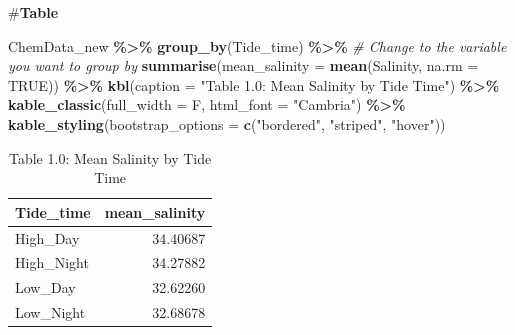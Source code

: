 \documentclass[
]{article}
\newenvironment{Shaded}{\begin{snugshade}}{\end{snugshade}}
\newcommand{\AttributeTok}[1]{\textcolor[rgb]{0.13,0.29,0.53}{#1}}
\newcommand{\CommentTok}[1]{\textcolor[rgb]{0.56,0.35,0.01}{\textit{#1}}}
\newcommand{\ConstantTok}[1]{\textcolor[rgb]{0.56,0.35,0.01}{#1}}
\newcommand{\FunctionTok}[1]{\textcolor[rgb]{0.13,0.29,0.53}{\textbf{#1}}}
\newcommand{\NormalTok}[1]{#1}
\newcommand{\SpecialCharTok}[1]{\textcolor[rgb]{0.81,0.36,0.00}{\textbf{#1}}}
\newcommand{\StringTok}[1]{\textcolor[rgb]{0.31,0.60,0.02}{#1}}
\begin{document}
\#\textbf{Table}

\begin{Shaded}
\begin{Highlighting}[]
\NormalTok{ChemData\_new }\SpecialCharTok{\%\textgreater{}\%}
  \FunctionTok{group\_by}\NormalTok{(Tide\_time) }\SpecialCharTok{\%\textgreater{}\%}  \CommentTok{\# Change to the variable you want to group by}
  \FunctionTok{summarise}\NormalTok{(}\AttributeTok{mean\_salinity =} \FunctionTok{mean}\NormalTok{(Salinity, }\AttributeTok{na.rm =} \ConstantTok{TRUE}\NormalTok{)) }\SpecialCharTok{\%\textgreater{}\%}
  \FunctionTok{kbl}\NormalTok{(}\AttributeTok{caption =} \StringTok{"Table 1.0: Mean Salinity by Tide Time"}\NormalTok{) }\SpecialCharTok{\%\textgreater{}\%}
  \FunctionTok{kable\_classic}\NormalTok{(}\AttributeTok{full\_width =}\NormalTok{ F, }\AttributeTok{html\_font =} \StringTok{"Cambria"}\NormalTok{) }\SpecialCharTok{\%\textgreater{}\%}
  \FunctionTok{kable\_styling}\NormalTok{(}\AttributeTok{bootstrap\_options =} \FunctionTok{c}\NormalTok{(}\StringTok{"bordered"}\NormalTok{, }\StringTok{"striped"}\NormalTok{, }\StringTok{"hover"}\NormalTok{)) }
\end{Highlighting}
\end{Shaded}

\begin{table}
\centering\centering
\caption{\label{tab:unnamed-chunk-3}Table 1.0: Mean Salinity by Tide Time}
\centering
\begin{tabular}[t]{l|r}
\hline
Tide\_time & mean\_salinity\\
\hline
High\_Day & 34.40687\\
\hline
High\_Night & 34.27882\\
\hline
Low\_Day & 32.62260\\
\hline
Low\_Night & 32.68678\\
\hline
\end{tabular}
\end{table}
\end{document}
